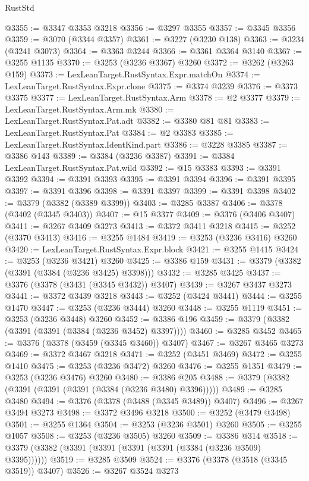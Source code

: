 \begin{lexlean}{RustStd}
\begin{coremodule}
{\begin{coremodule}
{{{{{{{{{{{{{{{{{{{{{{{{{{{{{{{{{{{{{{{@3355 := @3347 @3353 @3218
@3356 := @3297 @3355
@3357 := @3345 @3356
@3359 := @3070 (@3344 @3357)
@3361 := @3227 (@3230 @138)
@3363 := @3234 (@3241 @3073)
@3364 := @3363 @3244
@3366 := @3361 @3364 @3140
@3367 := @3255 @1135
@3370 := @3253 (@3236 @3367) @3260
@3372 := @3262 (@3263 @159)
@3373 := LexLeanTarget.RustSyntax.Expr.matchOn
@3374 := LexLeanTarget.RustSyntax.Expr.clone
@3375 := @3374 @3239
@3376 := @3373 @3375
@3377 := LexLeanTarget.RustSyntax.Arm
@3378 := @2 @3377
@3379 := LexLeanTarget.RustSyntax.Arm.mk
@3380 := LexLeanTarget.RustSyntax.Pat.adt
@3382 := @3380 @81 @81
@3383 := LexLeanTarget.RustSyntax.Pat
@3384 := @2 @3383
@3385 := LexLeanTarget.RustSyntax.IdentKind.part
@3386 := @3228 @3385
@3387 := @3386 @143
@3389 := @3384 (@3236 @3387)
@3391 := @3384 LexLeanTarget.RustSyntax.Pat.wild
@3392 := @15 @3383
@3393 := @3391 @3392
@3394 := @3391 @3393
@3395 := @3391 @3394
@3396 := @3391 @3395
@3397 := @3391 @3396
@3398 := @3391 @3397
@3399 := @3391 @3398
@3402 := @3379 (@3382 (@3389 @3399))
@3403 := @3285 @3387
@3406 := @3378 (@3402 (@3345 @3403))
@3407 := @15 @3377
@3409 := @3376 (@3406 @3407)
@3411 := @3267 @3409 @3273
@3413 := @3372 @3411 @3218
@3415 := @3252 (@3370 @3413)
@3416 := @3255 @1484
@3419 := @3253 (@3236 @3416) @3260
@3420 := LexLeanTarget.RustSyntax.Expr.block
@3421 := @3255 @1415
@3424 := @3253 (@3236 @3421) @3260
@3425 := @3386 @159
@3431 := @3379 (@3382 (@3391 (@3384 (@3236 @3425) @3398)))
@3432 := @3285 @3425
@3437 := @3376 (@3378 (@3431 (@3345 @3432)) @3407)
@3439 := @3267 @3437 @3273
@3441 := @3372 @3439 @3218
@3443 := @3252 (@3424 @3441)
@3444 := @3255 @1470
@3447 := @3253 (@3236 @3444) @3260
@3448 := @3255 @1119
@3451 := @3253 (@3236 @3448) @3260
@3452 := @3386 @196
@3459 := @3379 (@3382 (@3391 (@3391 (@3384 (@3236 @3452) @3397))))
@3460 := @3285 @3452
@3465 := @3376 (@3378 (@3459 (@3345 @3460)) @3407)
@3467 := @3267 @3465 @3273
@3469 := @3372 @3467 @3218
@3471 := @3252 (@3451 @3469)
@3472 := @3255 @1410
@3475 := @3253 (@3236 @3472) @3260
@3476 := @3255 @1351
@3479 := @3253 (@3236 @3476) @3260
@3480 := @3386 @205
@3488 := @3379 (@3382 (@3391 (@3391 (@3391 (@3384 (@3236 @3480) @3396)))))
@3489 := @3285 @3480
@3494 := @3376 (@3378 (@3488 (@3345 @3489)) @3407)
@3496 := @3267 @3494 @3273
@3498 := @3372 @3496 @3218
@3500 := @3252 (@3479 @3498)
@3501 := @3255 @1364
@3504 := @3253 (@3236 @3501) @3260
@3505 := @3255 @1057
@3508 := @3253 (@3236 @3505) @3260
@3509 := @3386 @314
@3518 := @3379 (@3382 (@3391 (@3391 (@3391 (@3391 (@3384 (@3236 @3509) @3395))))))
@3519 := @3285 @3509
@3524 := @3376 (@3378 (@3518 (@3345 @3519)) @3407)
@3526 := @3267 @3524 @3273
}}}}}}}}}}}}}}}}}}}}}}}}}}}}}}}}}}}}}}}
\end{coremodule}}
\end{coremodule}
\end{lexlean}
